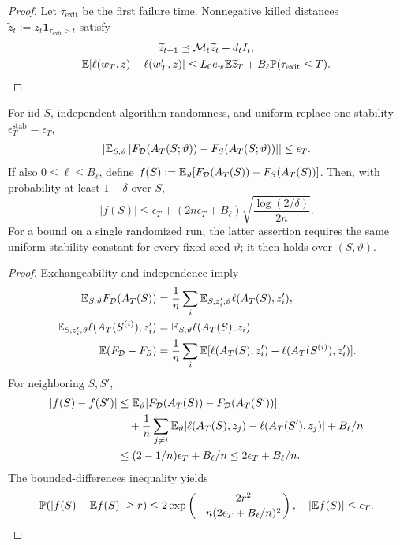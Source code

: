 \begin{proof}
Let $\tau_\mathrm{exit}$ be the first failure time. Nonnegative killed distances
$\widetilde z_t:=z_t\mathbf1_{\tau_\mathrm{exit}>t}$ satisfy
\begin{gather}
 \widetilde z_{t+1}\preceq\mathcal M_t\widetilde z_t+d_tI_t,\\
 \mathbb E|\ell(w_T,z)-\ell(w_T',z)|
 \le L_0e_w\mathbb E\widetilde z_T+B_\ell\mathbb P(\tau_\mathrm{exit}\le T).
\end{gather}
\end{proof}
\begin{theorem}\label{thm:rigid-generalization}
For iid $S$, independent algorithm randomness, and uniform replace-one stability
$\epsilon_T^{\mathrm{stab}}=\epsilon_T$,
\begin{equation}\label{eq:tf-gen}
 \left|\mathbb E_{S,\vartheta}\left[F_\mathcal D(A_T(S;\vartheta))
                          -F_S(A_T(S;\vartheta))\right]\right|\le\epsilon_T.
\end{equation}
If also $0\le\ell\le B_\ell$, define
$f(S):=\mathbb E_\vartheta[F_\mathcal D(A_T(S))-F_S(A_T(S))]$. Then, with probability
at least $1-\delta$ over $S$,
\begin{equation}
 |f(S)|\le\epsilon_T+(2n\epsilon_T+B_\ell)
                         \sqrt{\frac{\log(2/\delta)}{2n}}.
\end{equation}
For a bound on a single randomized run, the latter assertion requires the same
uniform stability constant for every fixed seed $\vartheta$; it then holds over
$(S,\vartheta)$.
\end{theorem}
\begin{proof}
Exchangeability and independence imply
\begin{align}
 \mathbb E_{S,\vartheta}F_\mathcal D(A_T(S))
 &=\frac1n\sum_i\mathbb E_{S,z_i',\vartheta}\ell(A_T(S),z_i'),\\
 \mathbb E_{S,z_i',\vartheta}\ell(A_T(S^{(i)}),z_i')
 &=\mathbb E_{S,\vartheta}\ell(A_T(S),z_i),\\
 \mathbb E(F_\mathcal D-F_S)
 &=\frac1n\sum_i\mathbb E[\ell(A_T(S),z_i')-\ell(A_T(S^{(i)}),z_i')].
\end{align}
For neighboring $S,S'$,
\begin{align}
 |f(S)-f(S')|
 &\le\mathbb E_\vartheta|F_\mathcal D(A_T(S))-F_\mathcal D(A_T(S'))|\\
 &\quad+\frac1n\sum_{j\ne i}\mathbb E_\vartheta
             |\ell(A_T(S),z_j)-\ell(A_T(S'),z_j)|+B_\ell/n\\
 &\le(2-1/n)\epsilon_T+B_\ell/n\le2\epsilon_T+B_\ell/n.
\end{align}
The bounded-differences inequality \citep{mcdiarmid1989bounded} yields
\begin{gather}
 \mathbb P(|f(S)-\mathbb E f(S)|\ge r)
 \le2\exp\left(-\frac{2r^2}{n(2\epsilon_T+B_\ell/n)^2}\right),\quad
 |\mathbb E f(S)|\le\epsilon_T.
\end{gather}
\end{proof}
